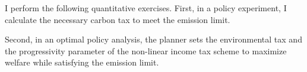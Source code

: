 
I perform the following quantitative exercises. First, in a policy experiment, I calculate the necessary carbon tax to meet the emission limit. 
 \begin{comment}
Before performing an optimal policy analysis, I calculate the necessary carbon tax to meet the emission limit. 
I find that a continuous increase in the carbon tax is necessary due to knowledge spillovers and heterogeneous labor shares. %
The former implies that growth in the green sector entails growth in the fossil sector. This aggravates the reduction of emissions. The latter aspect - heterogeneous labor shares - prevents as supply side mechanism which would make green production cheaper. With equal labor shares, the decline in labor demand by the fossil sector enables the green sector to raise production. However, the effectiveness of this supply-side channel is muted as the green production only relies on a small labor share. These two aspects reduce the effectiveness of the carbon tax.  
This finding suggests that a dynamic carbon tax is required to meet emission limits. In the second quantitative exercise, I ask how to optimally meet the emission limit.

content...
\end{comment}
 Second, in an optimal policy analysis, the planner sets the environmental tax and the progressivity parameter of the non-linear income tax scheme to maximize welfare while satisfying the emission limit.
 
